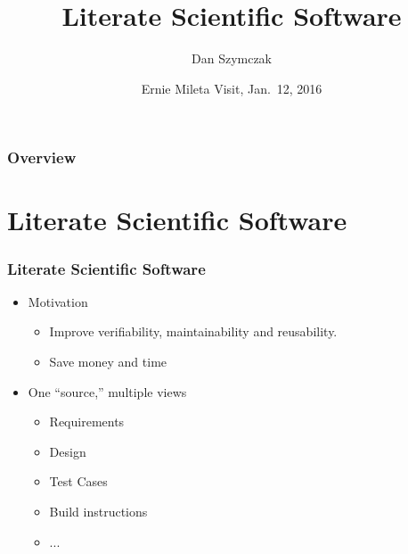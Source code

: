 \documentclass{beamer}
\title[\pgfuseimage{logo}]  %
{Literate Scientific Software}
\author[Slide \thepage~of \pageref{TotPages}] %
{Dan Szymczak}
\institute[McMaster University] %
{
  Computing and Software Department\\
  Faculty of Engineering\\
  McMaster University
}
\date[Jan 12, 2016] %
{Ernie Mileta Visit, Jan.\ 12, 2016}
\begin{document}
\begin{frame}

\titlepage

\end{frame}


\begin{frame}

\frametitle{Overview}
\tableofcontents


\end{frame}


\section[Literate Software]{Literate Scientific Software}



\begin{frame}

\frametitle{Literate Scientific Software}

\begin{itemize}
\item Motivation
\begin{itemize}
\item Improve verifiability, maintainability and reusability.
\item Save money and time%
\end{itemize}
\item One ``source,'' multiple views
\begin{itemize}
\item Requirements%
\item Design
\item Test Cases
\item Build instructions
\item ...
\end{itemize}
\end{itemize}
\end{frame}
\end{document}
